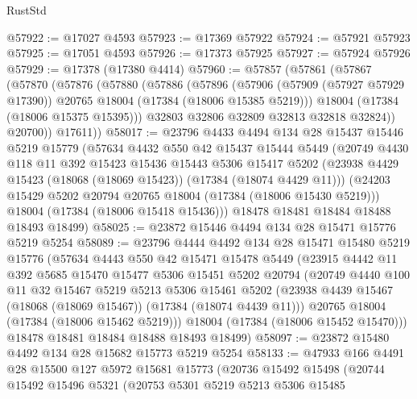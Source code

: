 \begin{lexlean}{RustStd}
\begin{coremodule}
@57922 := @17027 @4593
@57923 := @17369 @57922
@57924 := @57921 @57923
@57925 := @17051 @4593
@57926 := @17373 @57925
@57927 := @57924 @57926
@57929 := @17378 (@17380 @4414)
@57960 := @57857
    (@57861
      (@57867
        (@57870
          (@57876
            (@57880
              (@57886
                (@57896
                  (@57906
                    (@57909 (@57927 @57929 @17390))
                    @20765
                    @18004
                    (@17384 (@18006 @15385 @5219)))
                  @18004
                  (@17384 (@18006 @15375 @15395)))
                @32803
                @32806
                @32809
                @32813
                @32818
                @32824))
            @20700))
        @17611))
@58017 := @23796
    @4433
    @4494
    @134
    @28
    @15437
    @15446
    @5219
    @15779
    (@57634
      @4432
      @550
      @42
      @15437
      @15444
      @5449
      (@20749
        @4430
        @118
        @11
        @392
        @15423
        @15436
        @15443
        @5306
        @15417
        @5202
        (@23938 @4429 @15423 (@18068 (@18069 @15423)) (@17384 (@18074 @4429 @11)))
        (@24203 @15429 @5202 @20794 @20765 @18004 (@17384 (@18006 @15430 @5219)))
        @18004
        (@17384 (@18006 @15418 @15436)))
      @18478
      @18481
      @18484
      @18488
      @18493
      @18499)
@58025 := @23872 @15446 @4494 @134 @28 @15471 @15776 @5219 @5254
@58089 := @23796
    @4444
    @4492
    @134
    @28
    @15471
    @15480
    @5219
    @15776
    (@57634
      @4443
      @550
      @42
      @15471
      @15478
      @5449
      (@23915
        @4442
        @11
        @392
        @5685
        @15470
        @15477
        @5306
        @15451
        @5202
        @20794
        (@20749
          @4440
          @100
          @11
          @32
          @15467
          @5219
          @5213
          @5306
          @15461
          @5202
          (@23938 @4439 @15467 (@18068 (@18069 @15467)) (@17384 (@18074 @4439 @11)))
          @20765
          @18004
          (@17384 (@18006 @15462 @5219)))
        @18004
        (@17384 (@18006 @15452 @15470)))
      @18478
      @18481
      @18484
      @18488
      @18493
      @18499)
@58097 := @23872 @15480 @4492 @134 @28 @15682 @15773 @5219 @5254
@58133 := @47933
    @166
    @4491
    @28
    @15500
    @127
    @5972
    @15681
    @15773
    (@20736
      @15492
      @15498
      (@20744
        @15492
        @15496
        @5321
        (@20753
          @5301
          @5219
          @5213
          @5306
          @15485

\end{coremodule}
\end{lexlean}
